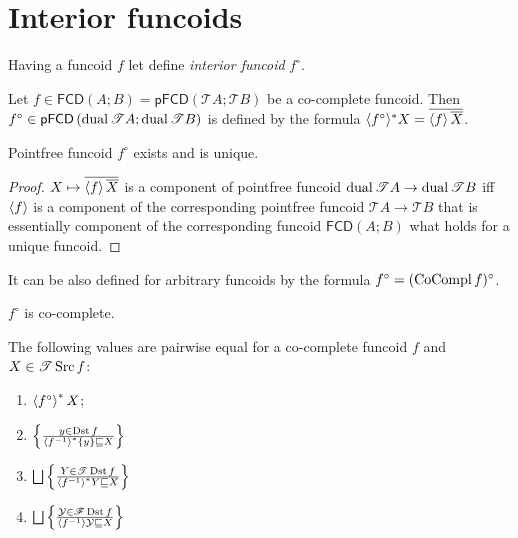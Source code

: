 \chapter{Interior funcoids}

Having a funcoid $f$ let define \emph{interior funcoid} $f^{\circ}$.

\begin{defn}
  Let $f \in \mathsf{\mathsf{FCD}} (A ; B) = \mathsf{\mathsf{pFCD}} \left(
  \mathscr{T} A ; \mathscr{T} B \right)$ be a co-complete funcoid. Then
  $f^{\circ} \in \mathsf{\mathsf{pFCD}} \left( \operatorname{dual} \mathscr{T} A ;
  \operatorname{dual} \mathscr{T} B \right)$ is defined by the formula $\langle
  f^{\circ} \rangle^{\ast} X = \overline{\left\langle f\right\rangle
  \overline{X}}$.
\end{defn}

\begin{prop}
  Pointfree funcoid $f^{\circ}$ exists and is unique.
\end{prop}

\begin{proof}
  $X \mapsto \overline{\left\langle f\right\rangle \overline{X}}$ is a component
  of pointfree funcoid $\operatorname{dual} \mathscr{T} A \rightarrow \operatorname{dual}
  \mathscr{T} B$ iff $\left\langle f\right\rangle$ is a component of the
  corresponding pointfree funcoid $\mathscr{T} A \rightarrow \mathscr{T} B$
  that is essentially component of the corresponding funcoid
  $\mathsf{\mathsf{FCD}} (A ; B)$ what holds for a unique funcoid.
\end{proof}

It can be also defined for arbitrary funcoids by the formula $f^{\circ} =
(\operatorname{CoCompl} f)^{\circ}$.

\begin{obvious}
$f^{\circ}$ is co-complete.
\end{obvious}

\begin{thm}
  The following values are pairwise equal for a co-complete funcoid $f$ and $X
  \in \mathscr{T} \operatorname{Src} f$:
  \begin{enumerate}
    \item\label{int-simpl} $\left\langle f^{\circ}\right\rangle ^{\ast} X$;
    
    \item\label{int-set} $\left\{ \frac{ y \in \operatorname{Dst} f }{ \left\langle  f^{-
    1} \right\rangle ^{\ast} \{ y \} \sqsubseteq X }\right\}$
    
    \item\label{int-sset-set} $\bigsqcup \setcond{ Y \in \mathscr{T} \Dst f }{
    \rsupfun{f^{- 1}} Y \sqsubseteq X }$
    
    \item\label{int-sset-flt} $\bigsqcup \setcond{ \mathcal{Y} \in \mathscr{F} \Dst f
    }{ \supfun{f^{- 1}} \mathcal{Y}
    \sqsubseteq X }$
  \end{enumerate}
\end{thm}

